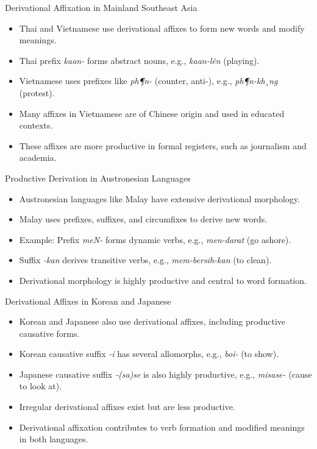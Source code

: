 \documentclass{beamer}
\begin{document}
\begin{frame}{Derivational Affixation in Mainland Southeast Asia}
    \begin{itemize}
        \item Thai and Vietnamese use derivational affixes to form new words and modify meanings.
        \item Thai prefix \textit{kaan-} forms abstract nouns, e.g., \textit{kaan-lên} (playing).
        \item Vietnamese uses prefixes like \textit{ph¶n-} (counter, anti-), e.g., \textit{ph¶n-kh¸ng} (protest).
        \item Many affixes in Vietnamese are of Chinese origin and used in educated contexts.
        \item These affixes are more productive in formal registers, such as journalism and academia.
    \end{itemize}
\end{frame}

\begin{frame}{Productive Derivation in Austronesian Languages}
    \begin{itemize}
        \item Austronesian languages like Malay have extensive derivational morphology.
        \item Malay uses prefixes, suffixes, and circumfixes to derive new words.
        \item Example: Prefix \textit{meN-} forms dynamic verbs, e.g., \textit{men-darat} (go ashore).
        \item Suffix \textit{-kan} derives transitive verbs, e.g., \textit{mem-bersih-kan} (to clean).
        \item Derivational morphology is highly productive and central to word formation.
    \end{itemize}
\end{frame}

\begin{frame}{Derivational Affixes in Korean and Japanese}
    \begin{itemize}
        \item Korean and Japanese also use derivational affixes, including productive causative forms.
        \item Korean causative suffix \textit{-i} has several allomorphs, e.g., \textit{boi-} (to show).
        \item Japanese causative suffix \textit{-(sa)se} is also highly productive, e.g., \textit{misase-} (cause to look at).
        \item Irregular derivational affixes exist but are less productive.
        \item Derivational affixation contributes to verb formation and modified meanings in both languages.
    \end{itemize}
\end{frame}
\end{document}

